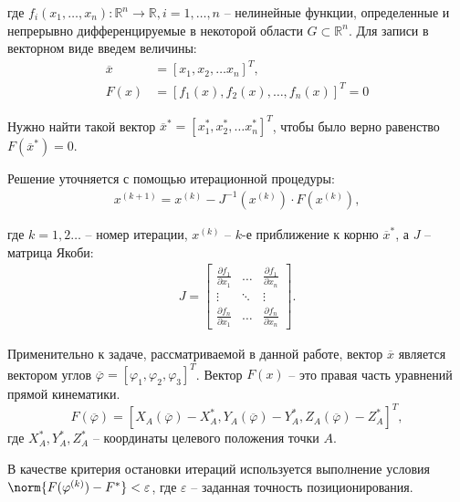 \noindent где $ f_i(x_1,\dots,x_n): \mathbb{R}^n \rightarrow \mathbb{R}, i=1,\dots, n $ -- нелинейные функции, определенные и непрерывно дифференцируемые в некоторой области $ G \subset \mathbb{R}^n $. Для записи в векторном виде введем величины:
\begin{align*}
    \overline{x} &= [x_1, x_2, \dots x_n]^T, \\
    F(x) &= [f_1(x), f_2(x),\dots,f_n(x)]^T = 0
\end{align*}

Нужно найти такой вектор $ \overline{x}^*=[x_1^*, x_2^*, \dots x_n^*]^T $, чтобы было верно равенство $ F(\overline{x}^*) = 0 $. 

Решение уточняется с помощью итерационной процедуры:
\begin{align*} %
    x^{(k+1)}=x^{(k)}-J^{-1}(x^{(k)}) \cdot F(x^{(k)}),
\end{align*} %

\noindent где $ k=1,2\dots $ -- номер итерации, $ x^{(k)} $ -- $k$-е приближение к корню $ \overline{x}^* $, а $ J $ -- матрица Якоби:
\begin{align*}
    J = \begin{bmatrix}
        \frac{\partial f_1}{\partial x_1} & \dots & \frac{\partial f_1}{\partial x_n} \\
        \vdots & \ddots & \vdots \\
        \frac{\partial f_n}{\partial x_1} & \dots & \frac{\partial f_n}{\partial x_n}
    \end{bmatrix}.
\end{align*}

Применительно к задаче, рассматриваемой в данной работе, вектор $ \overline{x} $ является  вектором углов $ \overline{\varphi} = [ \varphi_1, \varphi_2, \varphi_3 ]^T $. Вектор $ F(x) $ -- это правая часть уравнений прямой кинематики.
\begin{equation*}
    F(\overline{\varphi}) = [ X_A(\overline{\varphi}) - X_A^*, Y_A(\overline{\varphi}) - Y_A^*, Z_A(\overline{\varphi}) - Z_A^* ]^T,
\end{equation*}
где $ X_A^*, Y_A^*, Z_A^* $ -- координаты целевого положения точки $A$.

В качестве критерия остановки итераций используется выполнение условия $ \norm{F(\varphi^{(k)}) - F^* } < \varepsilon $, где $\varepsilon $ -- заданная точность позиционирования.

